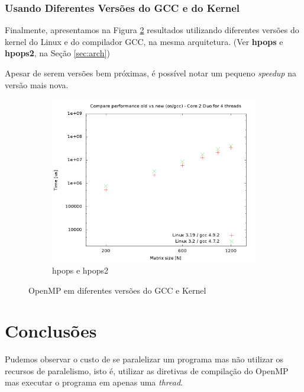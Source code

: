 \documentclass[a4paper, 12pt]{article}
\begin{document}
\subsubsection{Usando Diferentes Versões do GCC e do Kernel}

Finalmente, apresentamos na Figura \ref{fig:cmpv} resultados utilizando
diferentes versões do kernel do Linux e do compilador GCC, na mesma
arquitetura. (Ver \textbf{hpops} e \textbf{hpops2}, na Seção \ref{sec:arch})

Apesar de serem versões bem próximas, é possível notar um pequeno
\textit{speedup} na versão mais nova.

\begin{figure}[H]
    \centering
    \begin{subfigure}[H]{0.5\textwidth}
        \includegraphics[width=\textwidth]{compare_old_new_os}
        \caption{hpops e hpops2}
        \label{fig:hpops_hpops2}
    \end{subfigure}%
    \caption{OpenMP em diferentes versões do GCC e Kernel}\label{fig:cmpv}
\end{figure}

\newpage
\section{Conclusões} \label{sec:dis}

Pudemos observar o custo de se paralelizar um programa
mas não utilizar os recursos de paralelismo, isto é,
utilizar as diretivas de compilação do OpenMP mas
executar o programa em apenas uma \textit{thread}.
\end{document}
